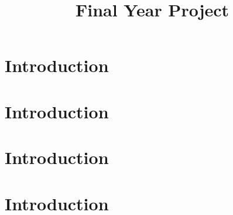 \documentclass[11pt, oneside]{article}
\title{Final Year Project}
\author{}
\date{}							%
\begin{document}
\maketitle
\tableofcontents

\section{Introduction}
\lipsum
\section{Introduction}
\lipsum
\section{Introduction}
\lipsum
\section{Introduction}
\lipsum
\end{document}
